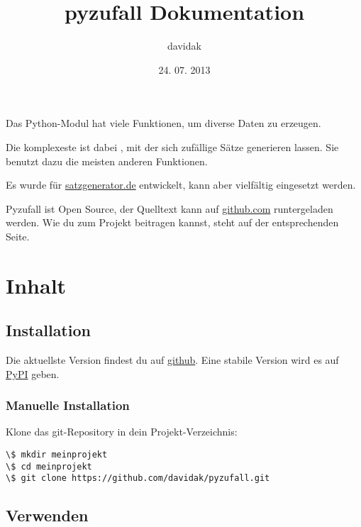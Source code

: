 \documentclass[a4paper,12pt,oneside]{sphinxmanual}
\title{pyzufall Dokumentation}
\date{24. 07. 2013}
\author{davidak}
\begin{document}
\maketitle
\tableofcontents
{}\label{index::doc}


Das Python-Modul {\hyperref[funktionen:module-pyzufall]{}} hat viele Funktionen, um diverse Daten zu erzeugen.

Die komplexeste ist dabei {\hyperref[funktionen:pyzufall.satz]{}}, mit der sich zufällige Sätze generieren lassen. Sie benutzt dazu die meisten anderen Funktionen.

Es wurde für \href{http://satzgenerator.de/}{satzgenerator.de} entwickelt, kann aber vielfältig eingesetzt werden.

Pyzufall ist Open Source, der Quelltext kann auf \href{https://github.com/davidak/pyzufall/}{github.com} runtergeladen werden. Wie du zum Projekt beitragen kannst, steht auf der entsprechenden Seite.


\chapter{Inhalt}
\label{index:inhalt}\label{index:dokumentation-von-pyzufall}

\section{Installation}
\label{installation:installation}\label{installation::doc}
Die aktuellste Version findest du auf \href{https://github.com/davidak/pyzufall}{github}. Eine stabile Version wird es auf \href{https://pypi.python.org/}{PyPI} geben.


\subsection{Manuelle Installation}
\label{installation:manuelle-installation}
Klone das git-Repository in dein Projekt-Verzeichnis:

\begin{Verbatim}[commandchars=\\\{\}]
\$ mkdir meinprojekt
\$ cd meinprojekt
\$ git clone https://github.com/davidak/pyzufall.git
\end{Verbatim}


\section{Verwenden}
\label{verwenden::doc}\label{verwenden:verwenden}
\end{document}
